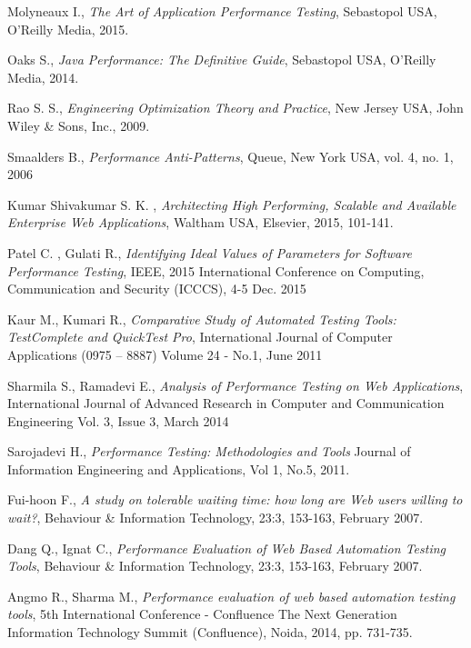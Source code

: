 \documentclass[10pt,a4paper]{article}
\begin{document}
\begin{thebibliography}{9}

Molyneaux I., 
\textit{The Art of Application Performance Testing}, 
Sebastopol USA, O’Reilly Media, 2015.

Oaks S., 
\textit{Java Performance: The Definitive Guide}, 
Sebastopol USA, O’Reilly Media, 2014.

Rao S. S., 
\textit{Engineering Optimization Theory and Practice}, 
New Jersey USA, John Wiley \& Sons, Inc., 2009.

Smaalders B., 
\textit{Performance Anti-Patterns},
Queue, New York USA, vol. 4, no. 1, 2006

Kumar Shivakumar S. K. , 
\textit{Architecting High Performing, Scalable and Available Enterprise Web Applications},
Waltham USA, Elsevier, 2015, 101-141.

Patel C. , Gulati R., 
\textit{Identifying Ideal Values of Parameters for Software Performance Testing},
IEEE, 2015 International Conference on Computing, Communication and Security (ICCCS), 4-5 Dec. 2015

Kaur M., Kumari R.,
\textit{Comparative Study of Automated Testing Tools: TestComplete and QuickTest Pro},
International Journal of Computer Applications (0975 – 8887) Volume 24 - No.1, June 2011

Sharmila S., Ramadevi E.,
\textit{Analysis of Performance Testing on Web Applications},
International Journal of Advanced Research in Computer and Communication Engineering Vol. 3, Issue 3, March 2014

Sarojadevi H.,
\textit{Performance Testing: Methodologies and Tools}
Journal of Information Engineering and Applications, Vol 1, No.5, 2011.

Fui-hoon F.,
\textit{A study on tolerable waiting time: how long are Web users willing to wait?}, Behaviour \& Information Technology, 23:3, 153-163, February 2007.

Dang Q., Ignat C., 
\textit{Performance Evaluation of Web Based Automation Testing Tools}, Behaviour \& Information Technology, 23:3, 153-163, February 2007.

Angmo R., Sharma M., 
\textit{Performance evaluation of web based automation testing tools}, 
5th International Conference - Confluence The Next Generation Information Technology Summit (Confluence), Noida, 2014, pp. 731-735.


\end{thebibliography}
\end{document}
